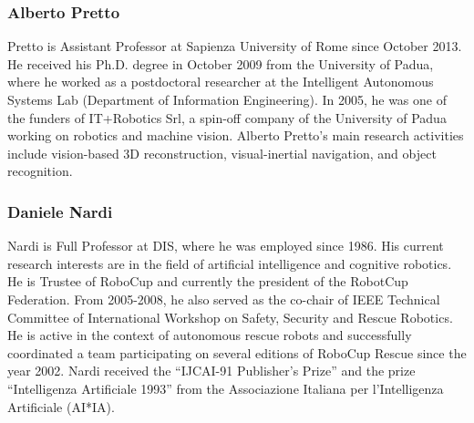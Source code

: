 \documentclass[conference]{IEEEtran}
\begin{document}

\subsubsection*{Alberto Pretto}

Pretto is Assistant Professor at Sapienza University of Rome since October 2013. 
He received his Ph.D. degree in October 2009 from the University of Padua, where he worked as a postdoctoral researcher at the Intelligent Autonomous Systems Lab (Department of Information Engineering). 
In 2005, he was one of the funders of IT+Robotics Srl, a spin-off company of the University of Padua working on robotics and machine vision. 
Alberto Pretto's main research activities include vision-based 3D reconstruction, visual-inertial navigation, and object recognition.

\subsubsection*{Daniele Nardi}

Nardi is Full Professor at DIS, where he was employed since 1986. His current research interests are in the field of artificial intelligence and cognitive robotics. He is Trustee of RoboCup and currently the president of the RobotCup Federation.  From 2005-2008, he also served as the co-chair of IEEE Technical Committee of International Workshop on Safety, Security and Rescue Robotics.  He is active in the context of autonomous rescue robots and successfully coordinated a team participating on several editions of RoboCup Rescue since the year 2002.  
Nardi received the ``IJCAI-91 Publisher's Prize'' and the prize ``Intelligenza Artificiale 1993'' from the Associazione Italiana per l'Intelligenza Artificiale (AI*IA).
\end{document}
